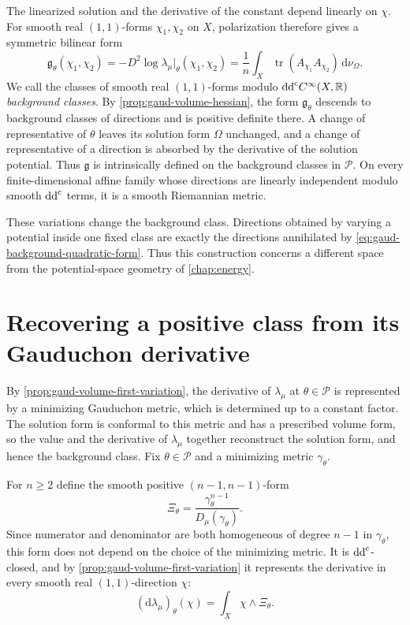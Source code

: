 The linearized solution and the derivative of the constant depend linearly on $\chi$. For smooth real $(1,1)$-forms $\chi_1,\chi_2$ on $X$, polarization therefore gives a symmetric bilinear form
\begin{equation}\label{eq:gaud-background-quadratic-form}
 \mathfrak g_\theta(\chi_1,\chi_2)
    =-D^2\log\lambda_\mu|_\theta(\chi_1,\chi_2)
    =\frac1n\int_X\operatorname{tr}(A_{\chi_1}A_{\chi_2})\,\mathrm{d}\nu_\Omega.
\end{equation}
We call the classes of smooth real $(1,1)$-forms modulo $\mathrm{dd}^{\mathrm{c}} C^\infty(X,\mathbb R)$ \emph{background classes}. By \cref{prop:gaud-volume-hessian}, the form $\mathfrak g_\theta$ descends to background classes of directions and is positive definite there. A change of representative of $\theta$ leaves its solution form $\Omega$ unchanged, and a change of representative of a direction is absorbed by the derivative of the solution potential. Thus $\mathfrak g$ is intrinsically defined on the background classes in $\mathscr P$. On every finite-dimensional affine family whose directions are linearly independent modulo smooth $\mathrm{dd}^{\mathrm{c}}$ terms, it is a smooth Riemannian metric.

These variations change the background class. Directions obtained by varying a potential inside one fixed class are exactly the directions annihilated by \eqref{eq:gaud-background-quadratic-form}. Thus this construction concerns a different space from the potential-space geometry of \cref{chap:energy}.

\section{Recovering a positive class from its Gauduchon derivative}
\label{sec:gaud-volume-gradient-recovery}

By \cref{prop:gaud-volume-first-variation}, the derivative of $\lambda_\mu$ at $\theta\in\mathscr P$ is represented by a minimizing Gauduchon metric, which is determined up to a constant factor. The solution form is conformal to this metric and has a prescribed volume form, so the value and the derivative of $\lambda_\mu$ together reconstruct the solution form, and hence the background class. Fix $\theta\in\mathscr P$ and a minimizing metric $\gamma_\theta$.

For $n\geq2$ define the smooth positive $(n-1,n-1)$-form
\[
 \Xi_\theta=\frac{\gamma_\theta^{n-1}}{D_\mu(\gamma_\theta)}.
\]
Since numerator and denominator are both homogeneous of degree $n-1$ in $\gamma_\theta$, this form does not depend on the choice of the minimizing metric. It is $\mathrm{dd}^{\mathrm{c}}$-closed, and by \cref{prop:gaud-volume-first-variation} it represents the derivative in every smooth real $(1,1)$-direction $\chi$:
\[
 (\mathrm{d}\lambda_\mu)_\theta(\chi)=\int_X\chi\wedge\Xi_\theta.
\]

